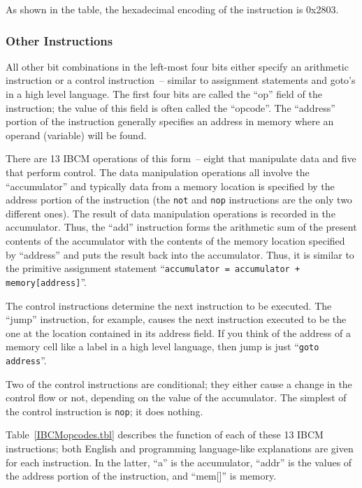 As shown in the table, the hexadecimal encoding of the instruction is 0x2803.

\subsubsection{Other Instructions}

All other bit combinations in the left-most four bits either specify
an arithmetic instruction or a control instruction~-- similar to
assignment statements and goto's in a high level language. The first four
bits are called the ``op'' field of the instruction; the value of this
field is often called the ``opcode''. The ``address'' portion of the
instruction generally specifies an address in memory where an operand
(variable) will be found.

There are 13 IBCM operations of this form~-- eight that manipulate
data and five that perform control. The data manipulation operations
all involve the ``accumulator'' and typically data from a memory
location is specified by the address portion of the instruction (the
{\tt not} and {\tt nop} instructions are the only two different ones).
The result of data manipulation operations is recorded in the
accumulator.  Thus, the ``add'' instruction forms the arithmetic sum
of the present contents of the accumulator with the contents of the
memory location specified by ``address'' and puts the result back into
the accumulator. Thus, it is similar to the primitive assignment
statement ``{\tt accumulator = accumulator + memory[address]}''.

The control instructions determine the next instruction to be
executed. The ``jump'' instruction, for example, causes the next
instruction executed to be the one at the location contained in its
address field. If you think of the address of a memory cell like a
label in a high level language, then jump is just ``{\tt goto
  address}''.

Two of the control instructions are conditional; they either cause a
change in the control flow or not, depending on the value of the
accumulator. The simplest of the control instruction is {\tt nop}; it
does nothing.

Table~\ref{IBCMopcodes.tbl} describes the function of each of these 13
IBCM instructions; both English and programming language-like
explanations are given for each instruction. In the latter, ``a'' is
the accumulator, ``addr'' is the values of the address portion of the
instruction, and ``mem[]'' is memory.

